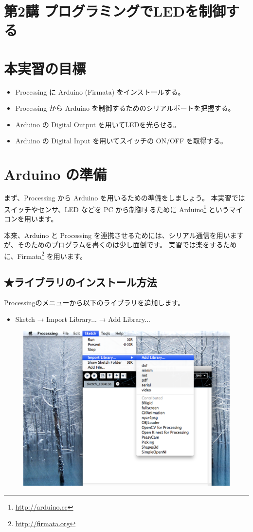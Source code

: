 \documentclass[11pt,a4paper]{jarticle}
\begin{document}
\section*{\LARGE{第2講 プログラミングでLEDを制御する}}
\section{本実習の目標}
\begin{itemize}
\item Processing に Arduino (Firmata) をインストールする。
\item Processing から Arduino を制御するためのシリアルポートを把握する。
\item Arduino の Digital Output を用いてLEDを光らせる。
\item Arduino の Digital Input を用いてスイッチの ON/OFF を取得する。
\end{itemize}



\section{Arduino の準備}
まず、Processing から Arduino を用いるための準備をしましょう。
本実習ではスイッチやセンサ、LED などを PC から制御するために Arduino\footnote{\url{http://arduino.cc}} というマイコンを用います。

本来、Arduino と Processing を連携させるためには、シリアル通信を用いますが、そのためのプログラムを書くのは少し面倒です。
実習では楽をするために、Firmata\footnote{\url{http://firmata.org}} を用います。

\subsection*{★ライブラリのインストール方法}

Processingのメニューから以下のライブラリを追加します。
\begin{itemize}
\item Sketch → Import Library... → Add Library...
\end{itemize}

\begin{figure}[htbp]
  \centering
  \includegraphics[width=0.75\columnwidth]{img/library01.eps}
  \label{figure:LED}
\end{figure}
\end{document}
